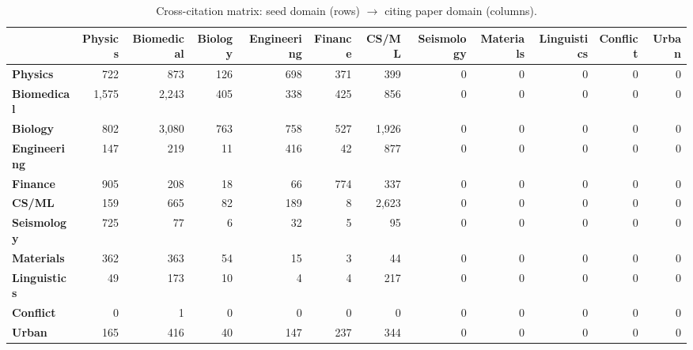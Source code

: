 \begin{table}[h]
\centering
\caption{Cross-citation matrix: seed domain (rows) $\to$ citing paper domain (columns).}
\label{tab:cross-matrix}
\begin{tabular}{lrrrrrrrrrrr}
\toprule
 & \textbf{Physics} & \textbf{Biomedical} & \textbf{Biology} & \textbf{Engineering} & \textbf{Finance} & \textbf{CS/ML} & \textbf{Seismology} & \textbf{Materials} & \textbf{Linguistics} & \textbf{Conflict} & \textbf{Urban} \\
\midrule
\textbf{Physics} & 722 & 873 & 126 & 698 & 371 & 399 & 0 & 0 & 0 & 0 & 0 \\
\textbf{Biomedical} & 1,575 & 2,243 & 405 & 338 & 425 & 856 & 0 & 0 & 0 & 0 & 0 \\
\textbf{Biology} & 802 & 3,080 & 763 & 758 & 527 & 1,926 & 0 & 0 & 0 & 0 & 0 \\
\textbf{Engineering} & 147 & 219 & 11 & 416 & 42 & 877 & 0 & 0 & 0 & 0 & 0 \\
\textbf{Finance} & 905 & 208 & 18 & 66 & 774 & 337 & 0 & 0 & 0 & 0 & 0 \\
\textbf{CS/ML} & 159 & 665 & 82 & 189 & 8 & 2,623 & 0 & 0 & 0 & 0 & 0 \\
\textbf{Seismology} & 725 & 77 & 6 & 32 & 5 & 95 & 0 & 0 & 0 & 0 & 0 \\
\textbf{Materials} & 362 & 363 & 54 & 15 & 3 & 44 & 0 & 0 & 0 & 0 & 0 \\
\textbf{Linguistics} & 49 & 173 & 10 & 4 & 4 & 217 & 0 & 0 & 0 & 0 & 0 \\
\textbf{Conflict} & 0 & 1 & 0 & 0 & 0 & 0 & 0 & 0 & 0 & 0 & 0 \\
\textbf{Urban} & 165 & 416 & 40 & 147 & 237 & 344 & 0 & 0 & 0 & 0 & 0 \\
\bottomrule
\end{tabular}
\end{table}